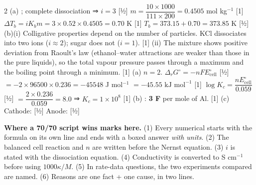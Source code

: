 \documentclass[10pt,a4paper]{extarticle}
\newcommand{\mk}[1]{{\scriptsize\color{black!55}[#1]}}
\begin{document}
\begin{multicols}{2}
\An (a) ; complete dissociation ⇒ $i=3$ \mk{½}\nl
$m=\dfrac{10\times1000}{111\times200}=0.4505$ mol kg$^{-1}$ \mk{1}\nl
$\Delta T_b=iK_bm=3\times0.52\times0.4505=0.70$ K \mk{1}\nl
$T_b=373.15+0.70=\boxed{373.85\text{ K}}$ \mk{½}\nl
(b)(i) Colligative properties depend on the number of particles. KCl dissociates into two ions ($i\approx2$); sugar does not ($i=1$). \mk{1}\nl
(ii) The mixture shows positive deviation from Raoult's law (ethanol--water attractions are weaker than those in the pure liquids), so the total vapour pressure passes through a maximum and the boiling point through a minimum. \mk{1}
\An (a) $n=2$. $\Delta_rG^\circ=-nFE^\circ_\text{cell}$ \mk{½} $=-2\times96500\times0.236=-45548$ J mol$^{-1}$ $=\boxed{-45.55\text{ kJ mol}^{-1}}$ \mk{1}\nl
$\log K_c=\dfrac{nE^\circ_\text{cell}}{0.059}$ \mk{½} $=\dfrac{2\times0.236}{0.059}=8.0$ ⇒ $K_c=\boxed{1\times10^{8}}$ \mk{1}\nl
(b) : \textbf{3 F} per mole of Al. \mk{1}\nl
(c) Cathode:  \mk{½}\nl
Anode:  \mk{½}
\end{multicols}
\begin{tcolorbox}[enhanced,colback=tipY,colframe=tipYframe,boxrule=0.5pt,arc=1.5pt,left=4pt,right=4pt,top=2pt,bottom=2pt,before skip=4pt]
\footnotesize\textbf{Where a 70/70 script wins marks here.} (1) Every numerical starts with the formula on its own line and ends with a boxed answer \emph{with units}. (2) The balanced cell reaction and $n$ are written before the Nernst equation. (3) $i$ is stated with the dissociation equation. (4) Conductivity is converted to S cm$^{-1}$ before using $1000\kappa/M$. (5) In rate-data questions, the two experiments compared are named. (6) Reasons are one fact + one cause, in two lines.
\end{tcolorbox}
\end{document}
